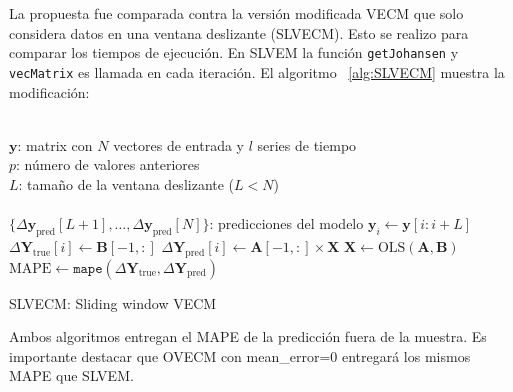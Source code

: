 La propuesta fue comparada contra la versión modificada VECM que solo considera
datos en una ventana deslizante (SLVECM). Esto se realizo para comparar los
tiempos de ejecución. En SLVEM la función \texttt{getJohansen} y
\texttt{vecMatrix} es llamada en cada iteración. El algoritmo ~\ref{alg:SLVECM}
muestra la modificación:

\begin{algorithm}[ht]
\begin{algorithmic}[1]
\REQUIRE $\,$ \\
$\mathbf{y}$: matrix con $N$ vectores de entrada y $l$ series de tiempo\\
$p$: número de valores anteriores\\
$L$: tamaño de la ventana deslizante ($L<N$) \\
\ENSURE  $\,$ \\
$\{\Delta \mathbf{y}_{\text{pred}}[L+1],\dots,\Delta \mathbf{y}_{\text{pred}}[N]\}$: predicciones del modelo
    \STATE $\mathbf{y}_i \gets \mathbf{y}[i:i+L]$
        \STATE $\Delta \mathbf{Y}_{\text{true}}[i] \gets \mathbf{B}[-1,:]$
        \STATE $\Delta \mathbf{Y}_{\text{pred}}[i] \gets \mathbf{A}[-1,:] \times \mathbf{X}$
    \ENDIF
    \STATE $\mathbf{X} \gets \text{OLS} (\mathbf{A},\mathbf{B})$
\ENDFOR
    \STATE $\text{MAPE} \gets \texttt{mape}(\Delta \mathbf{Y}_{\text{true}}, \Delta
    \mathbf{Y}_{\text{pred}})$
\end{algorithmic}
\caption{SLVECM: Sliding window VECM}
\label{alg:SLVECM}
\end{algorithm}

Ambos algoritmos entregan el MAPE de la predicción fuera de la muestra. Es
importante destacar que OVECM con mean\_error=0 entregará los mismos MAPE que
SLVEM.

